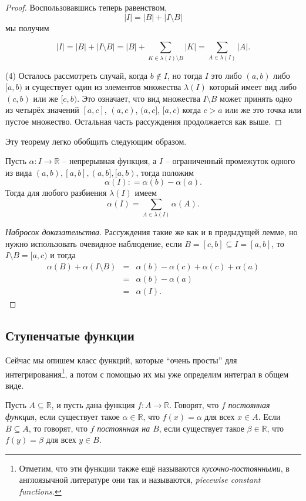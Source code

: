 \begin{proof}
Воспользовавшись теперь равенством,
\[
 |I| =|B| + |I \setminus B|
\]
мы получим

\[
 |I| = |B| + |I \setminus B| = |B| + \sum_{K \in \lambda(I) \setminus B} |K| = \sum_{A \in \lambda(I)} |A|.
\]

(4) Осталось рассмотреть случай, когда $b \notin I$, но тогда $I$ это либо $(a,b)$ либо $[a,b)$ и существует один из элементов множества $\lambda(I)$ который имеет вид либо $(c,b)$ или же $[c,b)$. Это означает, что вид множества $I \setminus B$ может принять одно из четырёх значений $[a,c]$, $(a,c)$, $(a,c]$, $[a,c)$ когда $c >a$ или же это точка или пустое множество. Остальная часть рассуждения продолжается как выше. 
\end{proof}


Эту теорему легко обобщить следующим образом.
\begin{lemma}\label{additive_of_a-lenght}
 Пусть $\alpha: I \to \mathbb{R}$ -- непрерывная функция, а $I$ -- ограниченный промежуток одного из вида $(a,b), [a,b], (a,b], [a,b)$, тогда положим
 \[
  \alpha(I): = \alpha(b) - \alpha(a).
 \]
Тогда для любого разбиения $\lambda(I)$ имеем
\[
 \alpha(I) = \sum_{A \in \lambda(I)}\alpha(A).
\]
\end{lemma}
\begin{proof}[Набросок доказательства]
    Рассуждения такие же как и в предыдущей лемме, но нужно использовать очевидное наблюдение, если $B  = [c,b] \subseteq I = [a,b]$, то $I\setminus B = [a,c)$ и тогда
    \begin{eqnarray*}
        \alpha(B) + \alpha(I \setminus B) &=& \alpha(b) - \alpha (c) + \alpha (c) + \alpha(a) \\
        &=& \alpha(b) -\alpha(a) \\
        &=& \alpha(I).
    \end{eqnarray*}
\end{proof}
 


\subsection{Ступенчатые функции}

Сейчас мы опишем класс функций, которые ``очень просты'' для интегрирования\footnote{Отметим, что эти функции также ещё называются \textit{кусочно-постоянными}, в англоязычной литературе они так и называются, \textit{piecewise constant functions.}}, а потом с помощью их мы уже определим интеграл в общем виде.  

\begin{definition}
  Пусть $A \subseteq \mathbb{R}$, и пусть дана функция $f: A \to \mathbb{R}$. Говорят, что $f$ \textit{постоянная функция}, если существует такое $\alpha \in \mathbb{R}$, что $f(x) = \alpha$ для всех $x \in A$. Если $B \subseteq A$, то говорят, что $f$ \textit{постоянная на $B$}, если существует такое $\beta \in \mathbb{R}$, что $f(y) = \beta$ для всех $y \in B.$
\end{definition}


